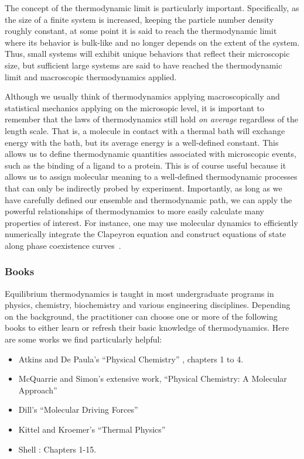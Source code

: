 \documentclass[9pt,bestpractices]{livecoms}
\begin{document}
The concept of the thermodynamic limit is particularly important.
Specifically, as the size of a finite system is increased, keeping the particle number density roughly constant, at some point it is said to reach the thermodynamic limit where its behavior is bulk-like and no longer depends on the extent of the system.
Thus, small systems will exhibit unique behaviors that reflect their microscopic size, but sufficient large systems are said to have reached the thermodynamic limit and macroscopic thermodynamics applied.

Although we usually think of thermodynamics applying macroscopically and statistical mechanics applying on the microsopic level, it is important to remember that the laws of thermodynamics still hold \textit{on average} regardless of the length scale.
That is, a molecule in contact with a thermal bath will exchange energy with the bath, but its average energy is a well-defined constant.
This allows us to define thermodynamic quantities associated with microscopic events, such as the binding of a ligand to a protein.
This is of course useful because it allows us to assign molecular meaning to a well-defined thermodynamic processes that can only be indirectly probed by experiment.
Importantly, as long as we have carefully defined our ensemble and thermodynamic path, we can apply the powerful relationships of thermodynamics to more easily calculate many properties of interest.
For instance, one may use molecular dynamics to efficiently numerically integrate the Clapeyron equation and construct equations of state along phase coexistence curves~\cite{Kofke1993, GonzalezSalgado2010}.


\subsubsection{Books}
Equilibrium thermodynamics is taught in most undergraduate programs in physics, chemistry, biochemistry and various engineering disciplines.
Depending on the background, the practitioner can choose one or more of the following books to either learn or refresh their basic knowledge of thermodynamics. 
Here are some works we find particularly helpful:
\begin{itemize}
\item Atkins and De Paula's ``Physical Chemistry'' \cite{AtkinsBook}, chapters 1 to 4.
\item McQuarrie and Simon's extensive work, ``Physical Chemistry: A Molecular Approach''~\cite{McQuarrie:1997:}
\item Dill's ``Molecular Driving Forces''~\cite{DillBook}
\item Kittel and Kroemer's ``Thermal Physics''~\cite{Kittel:1980:}
\item Shell \cite{ShellBook}: Chapters 1-15.
\end{itemize}
\end{document}
